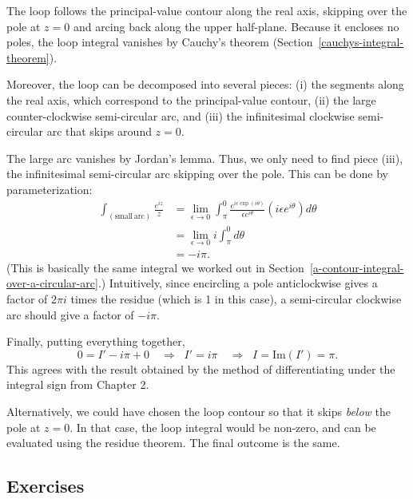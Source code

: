 \documentclass[10pt,a4paper]{article}
\begin{document}
The loop follows the principal-value contour along the real axis,
skipping over the pole at $z = 0$ and arcing back along the upper
half-plane. Because it encloses no poles, the loop integral vanishes
by Cauchy's theorem (Section~\ref{cauchys-integral-theorem}).

Moreover, the loop can be decomposed into several pieces: (i) the
segments along the real axis, which correspond to the principal-value
contour, (ii) the large counter-clockwise semi-circular arc, and (iii)
the infinitesimal clockwise semi-circular arc that skips around $z =
0$.

The large arc vanishes by Jordan's lemma. Thus, we only need to find
piece (iii), the infinitesimal semi-circular arc skipping over the
pole. This can be done by parameterization:
\begin{align}
  \int_{(\mathrm{small}\,\mathrm{arc})} \frac{e^{iz}}{z} &= \lim_{\epsilon \rightarrow 0} \int_{\pi}^{0} \frac{e^{i\epsilon \exp(i\theta)}}{\epsilon e^{i\theta}} \left(i\epsilon e^{i\theta}\right) d\theta \\ &= \lim_{\epsilon \rightarrow 0} i \int_{\pi}^0 d\theta \\ &= - i\pi.
\end{align}
(This is basically the same integral we worked out in
Section~\ref{a-contour-integral-over-a-circular-arc}.)  Intuitively,
since encircling a pole anticlockwise gives a factor of $2\pi i$ times
the residue (which is 1 in this case), a semi-circular clockwise arc
should give a factor of $- i \pi$.

Finally, putting everything together,
\begin{equation}
0 = I' - i \pi + 0 \quad \Rightarrow \;\; I' = i \pi \quad\Rightarrow \;\; I = \mathrm{Im}(I') = \pi.
\end{equation}
This agrees with the result obtained by the method of differentiating
under the integral sign from Chapter 2.

Alternatively, we could have chosen the loop contour so that it skips
\emph{below} the pole at $z = 0$. In that case, the loop integral
would be non-zero, and can be evaluated using the residue theorem. The
final outcome is the same.

\subsection{Exercises}\label{exercises}
\end{document}
